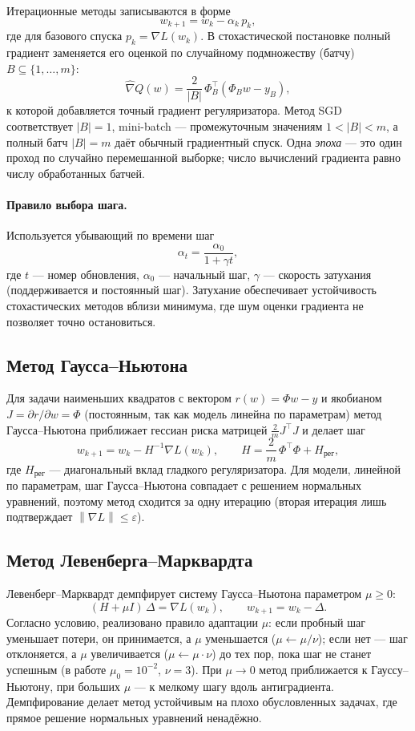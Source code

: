 \documentclass[a4paper,12pt]{article}
\newcommand{\norm}[1]{\left\|#1\right\|}
\newcommand{\grad}{\nabla}
\newcommand{\eps}{\varepsilon}
\theoremstyle{definition}
\begin{document}
Итерационные методы записываются в форме
\[
    w_{k+1} = w_k - \alpha_k\, p_k,
\]
где для базового спуска $p_k = \grad L(w_k)$. В стохастической постановке полный градиент
заменяется его оценкой по случайному подмножеству (батчу) $B \subseteq \{1, \dots, m\}$:
\[
    \widehat{\grad} Q(w) = \frac{2}{|B|}\, \Phi_B^\top (\Phi_B w - y_B),
\]
к которой добавляется точный градиент регуляризатора. Метод SGD соответствует $|B| = 1$,
mini-batch — промежуточным значениям $1 < |B| < m$, а полный батч $|B| = m$ даёт обычный
градиентный спуск. Одна \emph{эпоха} — это один проход по случайно перемешанной выборке;
число вычислений градиента равно числу обработанных батчей.

\paragraph{Правило выбора шага.}
Используется убывающий по времени шаг
\[
    \alpha_t = \frac{\alpha_0}{1 + \gamma t},
\]
где $t$ — номер обновления, $\alpha_0$ — начальный шаг, $\gamma$ — скорость затухания
(поддерживается и постоянный шаг). Затухание обеспечивает устойчивость стохастических методов
вблизи минимума, где шум оценки градиента не позволяет точно остановиться.

\subsection{Метод Гаусса--Ньютона}

Для задачи наименьших квадратов с вектором $r(w) = \Phi w - y$ и якобианом
$J = \partial r / \partial w = \Phi$ (постоянным, так как модель линейна по параметрам) метод
Гаусса--Ньютона приближает гессиан риска матрицей $\tfrac{2}{m} J^\top J$ и делает шаг
\[
    w_{k+1} = w_k - H^{-1} \grad L(w_k), \qquad
    H = \frac{2}{m}\, \Phi^\top \Phi + H_{\text{рег}},
\]
где $H_{\text{рег}}$ — диагональный вклад гладкого регуляризатора. Для модели, линейной по
параметрам, шаг Гаусса--Ньютона совпадает с решением нормальных уравнений, поэтому метод
сходится за одну итерацию (вторая итерация лишь подтверждает $\norm{\grad L} \leq \eps$).

\subsection{Метод Левенберга--Марквардта}

Левенберг--Марквардт демпфирует систему Гаусса--Ньютона параметром $\mu \geq 0$:
\[
    (H + \mu I)\, \Delta = \grad L(w_k), \qquad w_{k+1} = w_k - \Delta.
\]
Согласно условию, реализовано правило адаптации $\mu$: если пробный шаг уменьшает потери, он
принимается, а $\mu$ уменьшается ($\mu \leftarrow \mu / \nu$); если нет — шаг отклоняется, а
$\mu$ увеличивается ($\mu \leftarrow \mu \cdot \nu$) до тех пор, пока шаг не станет успешным
(в работе $\mu_0 = 10^{-2}$, $\nu = 3$). При $\mu \to 0$ метод приближается к Гауссу--Ньютону,
при больших $\mu$ — к мелкому шагу вдоль антиградиента. Демпфирование делает метод устойчивым
на плохо обусловленных задачах, где прямое решение нормальных уравнений ненадёжно.
\end{document}
